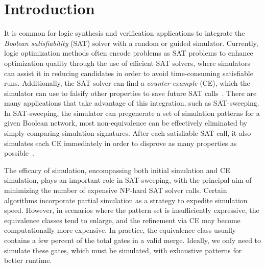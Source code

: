 \documentclass[conference]{IEEEtran}
\begin{document}
\vspace{-2mm}

\setlength{\arraycolsep}{1.5pt}
\renewcommand\arraystretch{0.5}
\section{Introduction}
\label{sec1}
It is common for logic synthesis and verification applications to integrate the \emph{Boolean satisfiability} (SAT) solver with a random or guided simulator.
Currently, logic optimization methods often encode problems as SAT problems to enhance optimization quality through the use of efficient SAT solvers, where simulators can assist it in reducing candidates in order to avoid time-consuming satisfiable runs. 
Additionally, the SAT solver can find a \emph{counter-example} (CE), which the simulator can use to falsify other properties to save future SAT calls~\cite{intro1}.
There are many applications that take advantage of this integration, such as SAT-sweeping.
In SAT-sweeping, the simulator can pregenerate a set of simulation patterns for a given Boolean network, most non-equivalence can be effectively eliminated by simply comparing simulation signatures.
After each satisfiable SAT call, it also simulates each CE immediately in order to disprove as many properties as possible~\cite{intro3,intro4,intro2}.

The efficacy of simulation, encompassing both initial simulation and CE simulation, plays an important role in SAT-sweeping, with the principal aim of minimizing the number of expensive NP-hard SAT solver calls.
Certain algorithms incorporate partial simulation as a strategy to expedite simulation speed. 
However, in scenarios where the pattern set is insufficiently expressive, the equivalence classes tend to enlarge, and the refinement via CE may become computationally more expensive.
In practice, the equivalence class usually contains a few percent of the total gates in a valid merge.
Ideally, we only need to simulate these gates, which must be simulated, with exhaustive patterns for better runtime.
\end{document}
